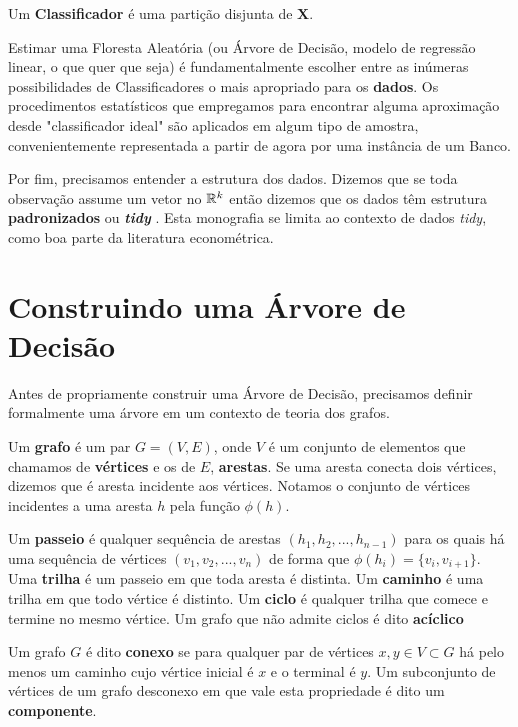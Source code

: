 \begin{defi}
Um \textbf{Classificador} é uma partição disjunta de $\mathbf{X}$.
\end{defi}

Estimar uma Floresta Aleatória (ou Árvore de Decisão, modelo de regressão linear, o que quer que seja) é fundamentalmente escolher entre as inúmeras possibilidades de Classificadores o mais apropriado para os \textbf{dados}. Os procedimentos estatísticos que empregamos para encontrar alguma aproximação desde "classificador ideal" são aplicados em algum tipo de amostra, convenientemente representada a partir de agora por uma instância de um Banco.

Por fim, precisamos entender a estrutura dos dados. Dizemos que se toda observação assume um vetor no $\mathbb{R}^k$ então dizemos que os dados têm estrutura \textbf{padronizados} ou \textbf{\textit{tidy}} \cite{tidyr}. Esta monografia se limita ao contexto de dados \textit{tidy}, como boa parte da literatura econométrica.

\section{Construindo uma Árvore de Decisão}

Antes de propriamente construir uma Árvore de Decisão, precisamos definir formalmente uma árvore em um contexto de teoria dos grafos. 

\begin{defi}
Um \textbf{grafo} é um par $G = (V, E)$, onde $V$ é um conjunto de elementos que chamamos de \textbf{vértices} e os de $E$, \textbf{arestas}. Se uma aresta conecta dois vértices, dizemos que é aresta incidente aos vértices. Notamos o conjunto de vértices incidentes a uma aresta $h$ pela função $\phi(h)$.
\end{defi}

\begin{defi}
Um \textbf{passeio} é qualquer sequência de arestas $(h_1, h_2, ..., h_{n-1})$ para os quais há uma sequência de vértices $(v_1, v_2, ..., v_n)$ de forma que $\phi(h_i) = \{v_i, v_{i+1}\}$. Uma \textbf{trilha} é um passeio em que toda aresta é distinta. Um \textbf{caminho} é uma trilha em que todo vértice é distinto. Um \textbf{ciclo} é qualquer trilha que comece e termine no mesmo vértice. Um grafo que não admite ciclos é dito \textbf{acíclico}
\end{defi}

\begin{defi}
Um grafo $G$ é dito \textbf{conexo} se para qualquer par de vértices $x, y \in V \subset G$ há pelo menos um caminho cujo vértice inicial é $x$ e o terminal é $y$. Um subconjunto de vértices de um grafo desconexo em que vale esta propriedade é dito um \textbf{componente}.
\end{defi}


